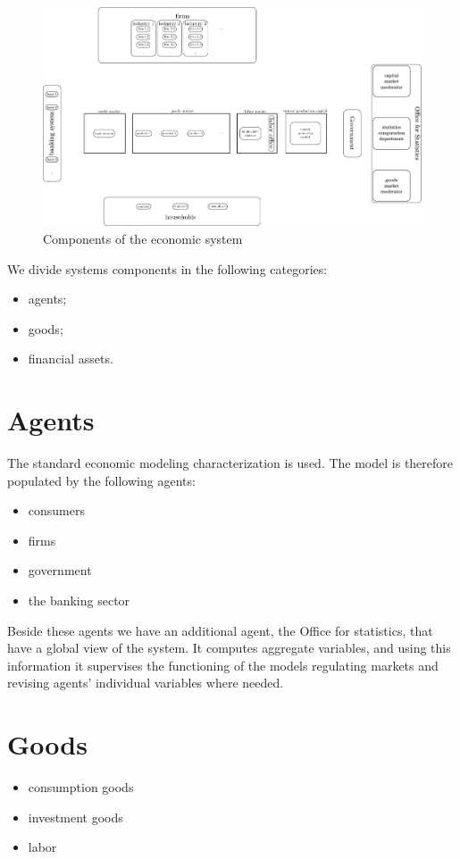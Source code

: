\documentclass{book}
\begin{document}
\begin{figure}[htp]
\hskip-1cm\includegraphics[scale=0.5]{agents_and_interactions_figure1.pdf}
	\caption{Components of the economic system}
	\label{fig:components}
\end{figure}
We divide systems components in the following categories:
\begin{itemize}
	\item agents;
	\item goods;
	\item financial assets.
\end{itemize}
\section{Agents}
The standard economic modeling characterization is used. The model is therefore populated by the following agents:
\begin{itemize}
	\item consumers
	\item firms
	\item government
	\item the banking sector


\end{itemize}
Beside these agents we have an additional agent, the Office for statistics, that have a global view of the system. It computes aggregate variables, and using this information it supervises the functioning of the models regulating markets and revising agents' individual variables where needed.

\section{Goods}
\begin{itemize}
	\item consumption goods
	\item investment goods
	\item labor
\end{itemize}
\end{document}

